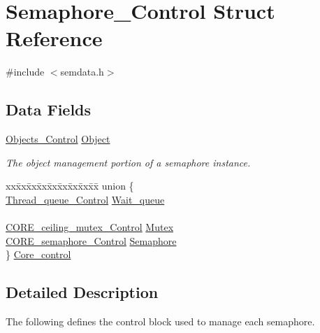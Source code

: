 \hypertarget{structSemaphore__Control}{}\section{Semaphore\+\_\+\+Control Struct Reference}
\label{structSemaphore__Control}


{\ttfamily \#include $<$semdata.\+h$>$}

\subsection*{Data Fields}
\begin{DoxyCompactItemize}
\item 
\mbox{\hyperlink{structObjects__Control}{Objects\+\_\+\+Control}} \mbox{\hyperlink{structSemaphore__Control_a18fdf9ca5b2a9cf682ec2115b6e2ba95}{Object}}
\begin{DoxyCompactList}\small\item\em The object management portion of a semaphore instance. \end{DoxyCompactList}\item 
\begin{tabbing}
xx\=xx\=xx\=xx\=xx\=xx\=xx\=xx\=xx\=\kill
union \{\\
\>\mbox{\hyperlink{structThread__queue__Control}{Thread\_queue\_Control}} \mbox{\hyperlink{structSemaphore__Control_a09ade1ef519c1be3601c8aeb8c75bf25}{Wait\_queue}}\\
\>\\
\>\mbox{\hyperlink{structCORE__ceiling__mutex__Control}{CORE\_ceiling\_mutex\_Control}} \mbox{\hyperlink{structSemaphore__Control_a6113e1e92ab2bc062ded9ac885188b3d}{Mutex}}\\
\>\mbox{\hyperlink{structCORE__semaphore__Control}{CORE\_semaphore\_Control}} \mbox{\hyperlink{structSemaphore__Control_a415970ccb41ee900c5b77cc060f51932}{Semaphore}}\\
\} \mbox{\hyperlink{structSemaphore__Control_abfcffe005d3e94d1735f4a9659a3b3e1}{Core\_control}}\\

\end{tabbing}\end{DoxyCompactItemize}


\subsection{Detailed Description}
The following defines the control block used to manage each semaphore. 

